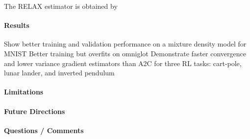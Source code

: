 The RELAX estimator is obtained by 

\paragraph{Results}
Show better training and validation performance on a mixture density model for MNIST
Better training but overfits on omniglot
Demonstrate faster convergence and lower variance gradient estimators than A2C for three RL tasks: cart-pole, lunar lander, and inverted pendulum

\paragraph{Limitations}

\paragraph{Future Directions}

\paragraph{Questions / Comments}

